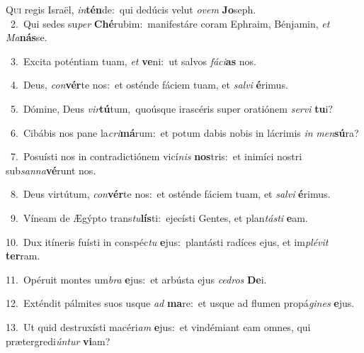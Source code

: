 \lettrine{\initial\textcolor{\initialcolor}{Q}}{ui} regis Israël, \textit{in}\-\textbf{tén}de:~\star qui dedúcis velut \textit{o}\-\textit{vem} \textbf{Jo}\-seph.\\
{\numbfont\textcolor{\numbcolor}{~2.}}~Qui sedes su\textit{per} \textbf{Ché}\-rubim:~\star manifestáre coram Ephraim, Bénjamin, \textit{et} \textit{Ma}\-\textbf{nás}se.\par
{\numbfont\textcolor{\numbcolor}{~3.}}~Excita poténtiam tuam, \textit{et} \textbf{ve}\-ni:~\star ut salvos \textit{fá}\-\textit{ci}\textbf{as} nos.\par
{\numbfont\textcolor{\numbcolor}{~4.}}~Deus, \textit{con}\-\textbf{vér}te nos:~\star et osténde fáciem tuam, et \textit{sal}\-\textit{vi} \textbf{é}\-rimus.\par
{\numbfont\textcolor{\numbcolor}{~5.}}~Dómine, Deus \textit{vir}\-\textbf{tú}tum,~\star quoúsque irascéris super oratiónem \textit{ser}\-\textit{vi} \textbf{tu}\-i?\par
{\numbfont\textcolor{\numbcolor}{~6.}}~Cibábis nos pane la\-\textit{cri}\-\textbf{má}rum:~\star et potum dabis nobis in lácrimis \textit{in} \textit{men}\-\textbf{sú}ra?\par
{\numbfont\textcolor{\numbcolor}{~7.}}~Posuísti nos in contradictiónem vicí\textit{nis} \textbf{nos}\-tris:~\star et inimíci nostri sub\-\textit{san}\-\textit{na}\textbf{vé}runt nos.\par
{\numbfont\textcolor{\numbcolor}{~8.}}~Deus virtútum, \textit{con}\-\textbf{vér}te nos:~\star et osténde fáciem tuam, et \textit{sal}\-\textit{vi} \textbf{é}\-rimus.\par
{\numbfont\textcolor{\numbcolor}{~9.}}~Víneam de Ægýpto trans\-\textit{tu}\-\textbf{lís}ti:~\star ejecísti Gentes, et plan\-\textit{tás}\-\textit{ti} \textbf{e}\-am.\par
{\numbfont\textcolor{\numbcolor}{10.}}~Dux itíneris fuísti in conspéc\textit{tu} \textbf{e}\-jus:~\star plantásti radíces ejus, et im\-\textit{plé}\-\textit{vit} \textbf{ter}\-ram.\par
{\numbfont\textcolor{\numbcolor}{11.}}~Opéruit montes um\textit{bra} \textbf{e}\-jus:~\star et arbústa ejus \textit{ce}\-\textit{dros} \textbf{De}\-i.\par
{\numbfont\textcolor{\numbcolor}{12.}}~Exténdit pálmites suos usque \textit{ad} \textbf{ma}\-re:~\star et usque ad flumen propá\-\textit{gi}\-\textit{nes} \textbf{e}\-jus.\par
{\numbfont\textcolor{\numbcolor}{13.}}~Ut quid destruxísti macéri\textit{am} \textbf{e}\-jus:~\star et vindémiant eam omnes, qui prætergredi\-\textit{ún}\-\textit{tur} \textbf{vi}\-am?\par
